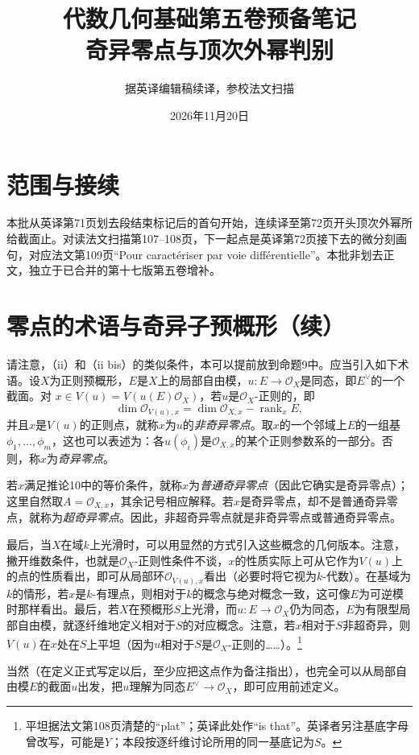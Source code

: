 \documentclass[openany,fontset=fandol]{ctexbook}
\newcommand{\Oa}{\mathcal O}
\begin{document}
\title{代数几何基础第五卷预备笔记\\奇异零点与顶次外幂判别}
\author{据英译编辑稿续译，参校法文扫描}
\date{2026年11月20日}
\maketitle
\chapter*{范围与接续}
本批从英译第71页划去段结束标记后的首句开始，连续译至第72页开头顶次外幂所给截面止。对读法文扫描第107--108页，下一起点是英译第72页接下去的微分刻画句，对应法文第109页“Pour caractériser par voie différentielle”。本批非划去正文，独立于已合并的第十七版第五卷增补。
\chapter*{零点的术语与奇异子预概形（续）}
请注意，（ii）和（ii bis）的类似条件，本可以提前放到命题9中。应当引入如下术语。设$X$为正则预概形，$E$是$X$上的局部自由模，$u:E\to\Oa_X$是同态，即$E^\vee$的一个截面。对
$x\in V(u)=V(u(E)\Oa_X)$，若$u$是$\Oa_X$-正则的，即
\[
\dim\Oa_{V(u),x}=\dim\Oa_{X,x}-\operatorname{rank}_x E,
\]
并且$x$是$V(u)$的正则点，就称$x$为$u$的\emph{非奇异零点}。取$x$的一个邻域上$E$的一组基$\phi_1,\ldots,\phi_m$，这也可以表述为：各$u(\phi_i)$是$\Oa_{X,x}$的某个正则参数系的一部分。否则，称$x$为\emph{奇异零点}。

若$x$满足推论10中的等价条件，就称$x$为\emph{普通奇异零点}（因此它确实是奇异零点）；这里自然取$A=\Oa_{X,x}$，其余记号相应解释。若$x$是奇异零点，却不是普通奇异零点，就称为\emph{超奇异零点}。因此，非超奇异零点就是非奇异零点或普通奇异零点。

最后，当$X$在域$k$上光滑时，可以用显然的方式引入这些概念的几何版本。注意，撇开维数条件，也就是$\Oa_X$-正则性条件不谈，$x$的性质实际上可从它作为$V(u)$上的点的性质看出，即可从局部环$\Oa_{V(u),x}$看出（必要时将它视为$k$-代数）。在基域为$k$的情形，若$x$是$k$-有理点，则相对于$k$的概念与绝对概念一致，这可像$E$为可逆模时那样看出。最后，若$X$在预概形$S$上光滑，而$u:E\to\Oa_X$仍为同态，$E$为有限型局部自由模，就逐纤维地定义相对于$S$的对应概念。注意，若$x$相对于$S$非超奇异，则$V(u)$在$x$处在$S$上平坦（因为$u$相对于$S$是$\Oa_X$-正则的……）。\footnote{平坦据法文第108页清楚的“plat”；英译此处作“is that”。英译者另注基底字母曾改写，可能是$Y$；本段按逐纤维讨论所用的同一基底记为$S$。}

当然（在定义正式写定以后，至少应把这点作为备注指出），也完全可以从局部自由模$E$的截面$u$出发，把$u$理解为同态$E^\vee\to\Oa_X$，即可应用前述定义。
\end{document}
